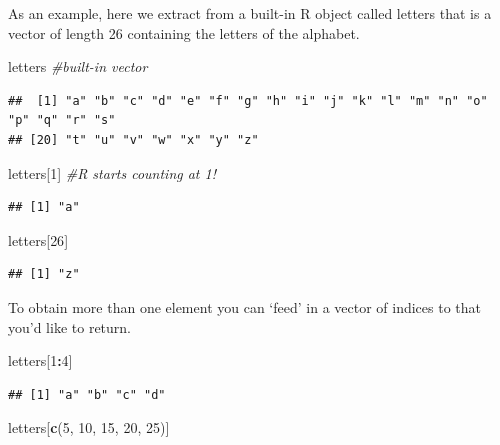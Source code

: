 \documentclass[
]{book}
\newenvironment{Shaded}{\begin{snugshade}}{\end{snugshade}}
\newcommand{\CommentTok}[1]{\textcolor[rgb]{0.56,0.35,0.01}{\textit{#1}}}
\newcommand{\DecValTok}[1]{\textcolor[rgb]{0.00,0.00,0.81}{#1}}
\newcommand{\KeywordTok}[1]{\textcolor[rgb]{0.13,0.29,0.53}{\textbf{#1}}}
\newcommand{\NormalTok}[1]{#1}
\newcommand{\OperatorTok}[1]{\textcolor[rgb]{0.81,0.36,0.00}{\textbf{#1}}}
\theoremstyle{definition}
\theoremstyle{definition}
\theoremstyle{definition}
\theoremstyle{remark}
\begin{document}
As an example, here we extract from a built-in R object called letters that is a vector of length 26 containing the letters of the alphabet.

\begin{Shaded}
\begin{Highlighting}[]
\NormalTok{letters }\CommentTok{#built-in vector}
\end{Highlighting}
\end{Shaded}

\begin{verbatim}
##  [1] "a" "b" "c" "d" "e" "f" "g" "h" "i" "j" "k" "l" "m" "n" "o" "p" "q" "r" "s"
## [20] "t" "u" "v" "w" "x" "y" "z"
\end{verbatim}

\begin{Shaded}
\begin{Highlighting}[]
\NormalTok{letters[}\DecValTok{1}\NormalTok{] }\CommentTok{#R starts counting at 1!}
\end{Highlighting}
\end{Shaded}

\begin{verbatim}
## [1] "a"
\end{verbatim}

\begin{Shaded}
\begin{Highlighting}[]
\NormalTok{letters[}\DecValTok{26}\NormalTok{]}
\end{Highlighting}
\end{Shaded}

\begin{verbatim}
## [1] "z"
\end{verbatim}

To obtain more than one element you can `feed' in a vector of indices to that you'd like to return.

\begin{Shaded}
\begin{Highlighting}[]
\NormalTok{letters[}\DecValTok{1}\OperatorTok{:}\DecValTok{4}\NormalTok{]}
\end{Highlighting}
\end{Shaded}

\begin{verbatim}
## [1] "a" "b" "c" "d"
\end{verbatim}

\begin{Shaded}
\begin{Highlighting}[]
\NormalTok{letters[}\KeywordTok{c}\NormalTok{(}\DecValTok{5}\NormalTok{, }\DecValTok{10}\NormalTok{, }\DecValTok{15}\NormalTok{, }\DecValTok{20}\NormalTok{, }\DecValTok{25}\NormalTok{)]}
\end{Highlighting}
\end{Shaded}
\end{document}
